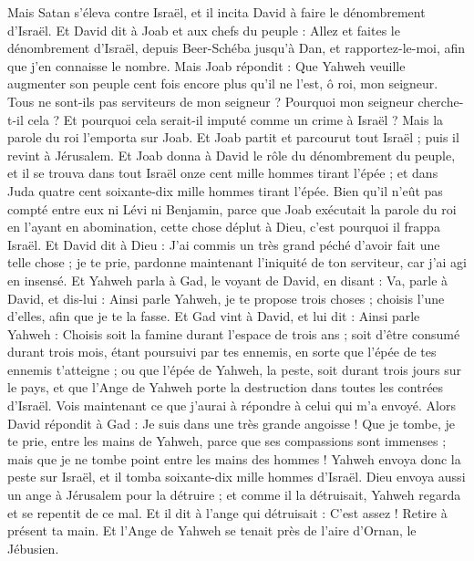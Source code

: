 \begin{multicols}{2}
\VerseOne{}Mais Satan s'éleva contre Israël, et il incita David à faire le dénombrement d'Israël.
Et David dit à Joab et aux chefs du peuple : Allez et faites le dénombrement d'Israël, depuis Beer-Schéba jusqu'à Dan, et rapportez-le-moi, afin que j'en connaisse le nombre.
Mais Joab répondit : Que Yahweh veuille augmenter son peuple cent fois encore plus qu'il ne l'est, ô roi, mon seigneur. Tous ne sont-ils pas serviteurs de mon seigneur ? Pourquoi mon seigneur cherche-t-il cela ? Et pourquoi cela serait-il imputé comme un crime à Israël ?
Mais la parole du roi l'emporta sur Joab. Et Joab partit et parcourut tout Israël ; puis il revint à Jérusalem.
Et Joab donna à David le rôle du dénombrement du peuple, et il se trouva dans tout Israël onze cent mille hommes tirant l'épée ; et dans Juda quatre cent soixante-dix mille hommes tirant l'épée.
Bien qu'il n'eût pas compté entre eux ni Lévi ni Benjamin, parce que Joab exécutait la parole du roi en l'ayant en abomination,
cette chose déplut à Dieu, c'est pourquoi il frappa Israël.
Et David dit à Dieu : J'ai commis un très grand péché d'avoir fait une telle chose ; je te prie, pardonne maintenant l'iniquité de ton serviteur, car j'ai agi en insensé.
Et Yahweh parla à Gad, le voyant de David, en disant :
Va, parle à David, et dis-lui : Ainsi parle Yahweh, je te propose trois choses ; choisis l'une d'elles, afin que je te la fasse.
Et Gad vint à David, et lui dit : Ainsi parle Yahweh :
Choisis soit la famine durant l'espace de trois ans ; soit d'être consumé durant trois mois, étant poursuivi par tes ennemis, en sorte que l'épée de tes ennemis t'atteigne ; ou que l'épée de Yahweh, la peste, soit durant trois jours sur le pays, et que l'Ange de Yahweh porte la destruction dans toutes les contrées d'Israël. Vois maintenant ce que j'aurai à répondre à celui qui m'a envoyé.
Alors David répondit à Gad : Je suis dans une très grande angoisse ! Que je tombe, je te prie, entre les mains de Yahweh, parce que ses compassions sont immenses ; mais que je ne tombe point entre les mains des hommes !
Yahweh envoya donc la peste sur Israël, et il tomba soixante-dix mille hommes d'Israël.
Dieu envoya aussi un ange à Jérusalem pour la détruire ; et comme il la détruisait, Yahweh regarda et se repentit de ce mal. Et il dit à l'ange qui détruisait : C'est assez ! Retire à présent ta main. Et l'Ange de Yahweh se tenait près de l'aire d'Ornan, le Jébusien.

\end{multicols}
